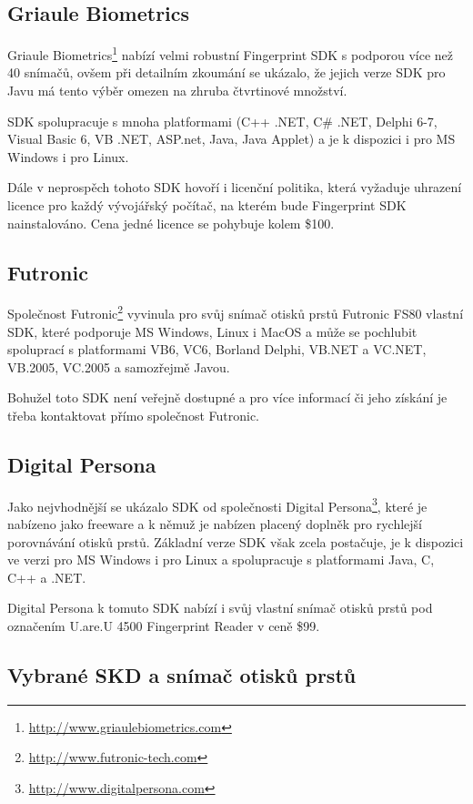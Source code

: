 \documentclass[11pt,twoside,a4paper]{book}
\begin{document}
\subsection{Griaule Biometrics}

Griaule Biometrics\footnote{\url{http://www.griaulebiometrics.com}} nabízí velmi robustní Fingerprint SDK s podporou více než 40 snímačů, ovšem při detailním zkoumání se ukázalo, že jejich verze SDK pro Javu má tento výběr omezen na zhruba čtvrtinové množství. 

SDK spolupracuje s mnoha platformami (C++ .NET, C\# .NET, Delphi 6-7, Visual Basic 6, VB .NET, ASP.net, Java, Java Applet) a je k dispozici i pro MS Windows i pro Linux. 

Dále v neprospěch tohoto SDK hovoří i licenční politika, která vyžaduje uhrazení licence pro každý vývojářský počítač, na kterém bude Fingerprint SDK nainstalováno. Cena jedné licence se pohybuje kolem \$100.

\subsection{Futronic}

Společnost Futronic\footnote{\url{http://www.futronic-tech.com}} vyvinula pro svůj snímač otisků prstů Futronic FS80 vlastní SDK, které podporuje MS Windows, Linux i MacOS a může se pochlubit spoluprací s platformami VB6, VC6, Borland Delphi, VB.NET a VC.NET, VB.2005, VC.2005 a samozřejmě Javou.

Bohužel toto SDK není veřejně dostupné a pro více informací či jeho získání je třeba kontaktovat přímo společnost Futronic. 

\subsection{Digital Persona}

Jako nejvhodnější se ukázalo SDK od společnosti Digital Persona\footnote{\url{http://www.digitalpersona.com}}, které je nabízeno jako freeware a k němuž je nabízen placený doplněk pro rychlejší porovnávání otisků prstů. Základní verze SDK však zcela postačuje, je k dispozici ve verzi pro MS Windows i pro Linux a spolupracuje s platformami Java, C, C++ a .NET.

Digital Persona k tomuto SDK nabízí i svůj vlastní snímač otisků prstů pod označením U.are.U 4500 Fingerprint Reader v ceně \$99.

\subsection{Vybrané SKD a snímač otisků prstů} \label{sec:vybrany_snimac}
\end{document}
